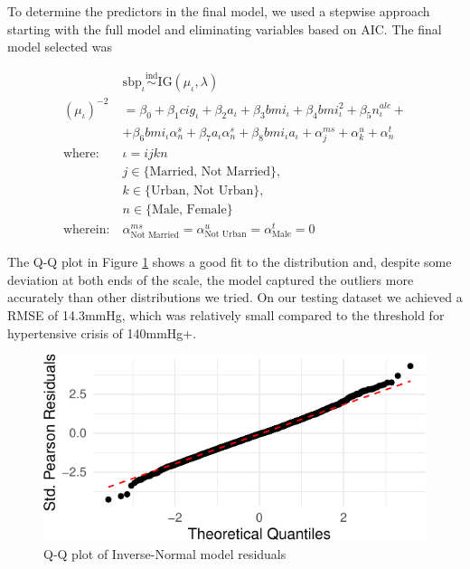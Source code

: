 \documentclass[
  11pt,
  twocolumn]{article}
\begin{document}
To determine the predictors in the final model, we used a stepwise
approach starting with the full model and eliminating variables based on
AIC. The final model selected was

\begin{align*}
&\text{sbp}_{\iota} \overset{\text{ind}}{\sim} \text{IG}(\mu_{\iota}, \lambda) \\
(\mu_{\iota})^{-2} &= \beta_0 + \beta_1cig_{\iota} + \beta_2a_{\iota} + \beta_3bmi_{\iota} + \beta_4bmi_{\iota}^2+ \beta_5n^{alc}_{\iota} + \\
&+\beta_6bmi_{\iota}\alpha^{s}_n + \beta_7a_{\iota}\alpha^{s}_n + \beta_8bmi_{\iota}a_{\iota} + \alpha^{ms}_j + \alpha^{u}_k   + \alpha^{t}_n \\
\text{where: } &\iota=ijkn \\
&j \in \{\text{Married, Not Married}\}, \\
&k \in \{\text{Urban, Not Urban}\}, \\
&n \in \{\text{Male, Female\}}\ \\
\text{wherein:} \ &\alpha^{ms}_{\text{Not Married}} =
\alpha^{u}_{\text{Not Urban}} = \alpha^{t}_{\text{Male}}= 0
\end{align*}

The Q-Q plot in Figure \ref{fig:output-qq-plot} shows a good fit to the
distribution and, despite some deviation at both ends of the scale, the
model captured the outliers more accurately than other distributions we
tried. On our testing dataset we achieved a RMSE of 14.3mmHg, which was
relatively small compared to the threshold for hypertensive crisis of
140mmHg+.

\begin{figure}[H]

{\centering \includegraphics{Coursework_files/figure-latex/output-qq-plot-1} 

}

\caption{Q-Q plot of Inverse-Normal model residuals}\label{fig:output-qq-plot}
\end{figure}
\end{document}
